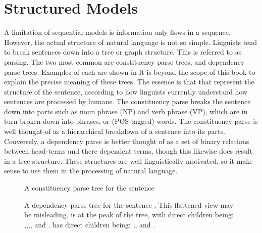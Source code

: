 \documentclass[12pt,parskip]{komatufte}
\begin{document}
\section{Structured Models}

A limitation of sequential models is information only flows in a sequence.
However, the actual structure of natural language is not so simple.
Linguists tend to break sentences down into a tree or graph structure.
This is referred to as parsing.
The two most common are constituency parse trees, and dependency parse trees.
Examples of each are shown in 
It is beyond the scope of this book to explain the precise meaning of these trees.
The essence is that that represent the structure of the sentence,
according to how linguists currently understand how sentences are processed by humans.
The constituency parse breaks the sentence down into parts such as noun phrase (NP) and verb phrase (VP),
which are in turn broken down into phrases, or (POS tagged) words.
The constituency parse is well thought-of as a hierarchical breakdown of a sentence into its parts.
Conversely, a dependency parse is better thought of as a set of binary relations between head-terms and there dependent terms, though this likewise does result in a tree structure.
These structures are well linguistically motivated, so it make sense to use them in the processing of natural language.

\begin{figure}
	\caption{A constituency parse tree for the sentence }
	\label{fig:consparse}
\end{figure}


\begin{figure}
	\caption{A dependency parse tree for the sentence ,
	This flattened view may be misleading.
	 is at the peak of the tree, with direct children	being:
	,,,,
	and .
	 has direct children being: ,, and .
}
	\label{fig:depparse}
\end{figure}
\end{document}
